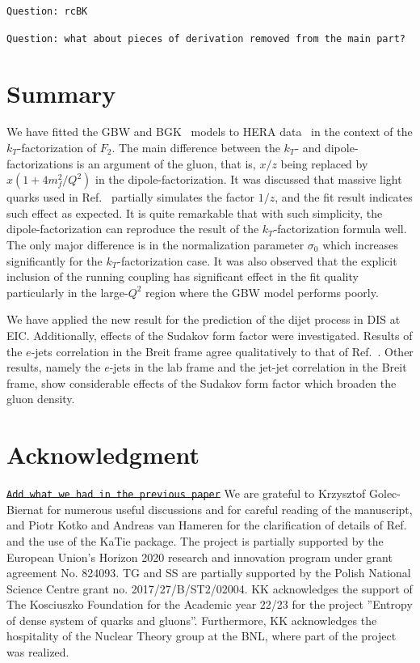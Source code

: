\documentclass[11pt]{article}
\numberwithin{equation}{section}
\numberwithin{table}{section}
\numberwithin{figure}{section}
\newcommand{\comment}[1]{\texttt{\color{red}#1}}
\begin{document}
\comment{Question: rcBK}

\comment{Question: what about pieces of derivation removed from the main part?}

\section{Summary}
We have fitted the GBW\cite{Golec-Biernat:1998zce}
and BGK~\cite{Bartels:2002cj} models to HERA
data~\cite{Abt:2017nkc} in the context of the $k_T$-factorization of $F_2$.  The
main difference between the $k_T$- and dipole-factorizations is an argument of
the gluon, that is, $x/z$ being replaced by $x(1+4m_f^2/Q^2)$ in the
dipole-factorization. It was discussed that massive light quarks used in
Ref.~\cite{Golec-Biernat:1998zce} partially simulates the factor $1/z$, and the
fit result indicates such effect as expected. It is quite remarkable that with
such simplicity, the dipole-factorization can reproduce the result of the
$k_T$-factorization formula well. The only major difference is in the normalization parameter $\sigma_0$ which increases significantly for the $k_T$-factorization case. It was also observed that the explicit inclusion of the running coupling has significant effect in the fit quality particularly in the large-$Q^2$ region where the GBW model performs poorly. 

We have applied the new result for the prediction of the dijet process in DIS at EIC. Additionally, effects of the Sudakov form factor were investigated. Results of the $e$-jets correlation in the Breit frame agree qualitatively to that of Ref.~\cite{vanHameren:2021sqc}. Other results, namely the $e$-jets in the lab frame and the jet-jet correlation in the Breit frame, show considerable effects of the Sudakov form factor which broaden the gluon density.  


\section*{Acknowledgment}
\sout{\comment{Add what we had in the previous paper}}
We are grateful to Krzysztof Golec-Biernat for numerous useful discussions and for careful reading of the manuscript, and Piotr Kotko and Andreas van Hameren for the clarification of details of Ref.~\cite{vanHameren:2021sqc} and the use of the KaTie package. The project is partially supported by 
the European Union’s Horizon 2020 research and innovation program under grant agreement No. 824093.
TG and SS are partially supported by the Polish National Science Centre grant no. 2017/27/B/ST2/02004.
KK acknowledges the support of The Kosciuszko Foundation for the Academic year 22/23 for the
project ”Entropy of dense system of quarks and gluons”. Furthermore, KK  acknowledges the hospitality of the Nuclear Theory group at the BNL, where part of the  project was realized. 
\end{document}
